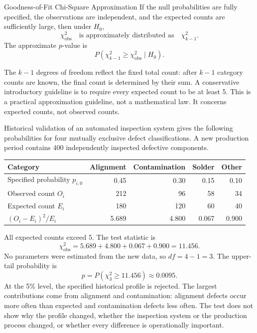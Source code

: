 \begin{theorem}{Goodness-of-Fit Chi-Square Approximation}
If the null probabilities are fully specified, the observations are independent, and the expected counts are sufficiently large, then under $H_0$,
\[
\chi^2_{\mathrm{obs}}
\quad\text{is approximately distributed as}\quad
\chi^2_{k-1}.
\]
The approximate $p$-value is
\[
P\!\left(\chi^2_{k-1}\geq\chi^2_{\mathrm{obs}}\mid H_0\right).
\]
\end{theorem}

The $k-1$ degrees of freedom reflect the fixed total count: after $k-1$ category counts are known, the final count is determined by their sum. A conservative introductory guideline is to require every expected count to be at least 5. This is a practical approximation guideline, not a mathematical law. It concerns expected counts, not observed counts.

\begin{example}\par
Historical validation of an automated inspection system gives the following probabilities for four mutually exclusive defect classifications. A new production period contains 400 independently inspected defective components.

\begin{center}
\begin{tabular}{lrrrr}
\toprule
Category & Alignment & Contamination & Solder & Other \\
\midrule
Specified probability $p_{i,0}$ & 0.45 & 0.30 & 0.15 & 0.10 \\
Observed count $O_i$ & 212 & 96 & 58 & 34 \\
Expected count $E_i$ & 180 & 120 & 60 & 40 \\
$(O_i-E_i)^2/E_i$ & 5.689 & 4.800 & 0.067 & 0.900 \\
\bottomrule
\end{tabular}
\end{center}

All expected counts exceed 5. The test statistic is
\[
\chi^2_{\mathrm{obs}}
=5.689+4.800+0.067+0.900
=11.456.
\]
No parameters were estimated from the new data, so $df=4-1=3$. The upper-tail probability is
\[
p=P(\chi^2_3\geq11.456)\approx0.0095.
\]
At the 5\% level, the specified historical profile is rejected. The largest contributions come from alignment and contamination: alignment defects occur more often than expected and contamination defects less often. The test does not show why the profile changed, whether the inspection system or the production process changed, or whether every difference is operationally important.
\end{example}

